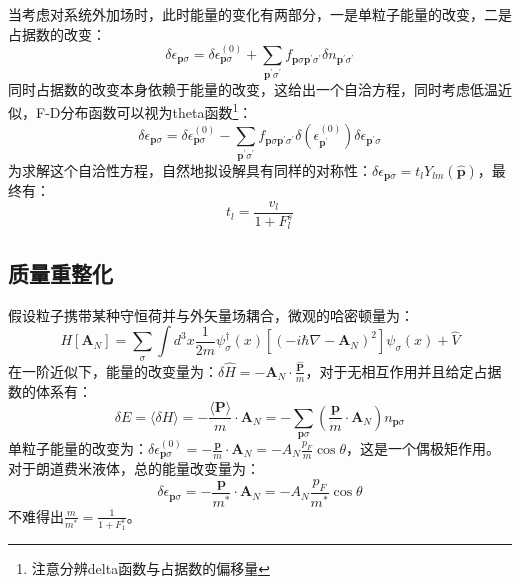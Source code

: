 \documentclass[10pt,openany]{book}
\theoremstyle{thmstyle} %
\theoremstyle{defstyle} %
\theoremstyle{prostyle} %
\begin{document}
当考虑对系统外加场时，此时能量的变化有两部分，一是单粒子能量的改变，二是占据数的改变：
\begin{equation}
	\delta \epsilon_{\mathbf{p} \sigma}=\delta \epsilon_{\mathbf{p} \sigma}^{(0)}+\sum_{\mathbf{p}^{\prime} \sigma^{\prime}} f_{\mathbf{p} \sigma \mathbf{p}^{\prime} \sigma^{\prime}} \delta n_{\mathbf{p}^{\prime} \sigma^{\prime}}
\end{equation}
同时占据数的改变本身依赖于能量的改变，这给出一个自洽方程，同时考虑低温近似，F-D分布函数可以视为theta函数\footnote{注意分辨delta函数与占据数的偏移量}：
\begin{equation}
	\delta \epsilon_{\mathbf{p} \sigma}=\delta \epsilon_{\mathbf{p} \sigma}^{(0)}-\sum_{\mathbf{p}^{\prime} \sigma^{\prime}} f_{\mathbf{p} \sigma \mathbf{p}^{\prime} \sigma^{\prime}} \delta\left(\epsilon_{\mathbf{p}^{\prime}}^{(0)}\right) \delta \epsilon_{\mathbf{p}^{\prime} \sigma}
\end{equation}
为求解这个自洽性方程，自然地拟设解具有同样的对称性：$ \delta \epsilon_{\mathbf{p} \sigma}=t_l Y_{l m}(\hat{\mathbf{p}}) $，最终有：
\begin{equation}
	t_l=\frac{v_l}{1+F_l^s}
\end{equation} 
\subsection{质量重整化}
假设粒子携带某种守恒荷并与外矢量场耦合，微观的哈密顿量为：
\begin{equation}
	H\left[\mathbf{A}_N\right]=\sum_\sigma \int d^3 x \frac{1}{2 m} \psi_\sigma^{\dagger}(x)\left[\left(-i \hbar \nabla-\mathbf{A}_N\right)^2\right] \psi_\sigma(x)+\hat{V}
\end{equation}
在一阶近似下，能量的改变量为：$ \delta \hat{H}=-\mathbf{A}_N \cdot \frac{\hat{\mathbf{P}}}{m} $，对于无相互作用并且给定占据数的体系有：
\begin{equation}
	\delta E=\langle\delta H\rangle=-\frac{\langle\mathbf{P}\rangle}{m} \cdot \mathbf{A}_N=-\sum_{\mathbf{p} \sigma}\left(\frac{\mathbf{p}}{m} \cdot \mathbf{A}_N\right) n_{\mathbf{p} \sigma}
\end{equation} 
单粒子能量的改变为：$ \delta \epsilon_{\mathbf{p} \sigma}^{(0)}=-\frac{\mathbf{p}}{m} \cdot \mathbf{A}_N=-A_N \frac{p_F}{m} \cos \theta $，这是一个偶极矩作用。对于朗道费米液体，总的能量改变量为：
\begin{equation}
	\delta \epsilon_{\mathbf{p} \sigma}=-\frac{\mathbf{p}}{m^*} \cdot \mathbf{A}_N=-A_N \frac{p_F}{m^*} \cos \theta
\end{equation} 
不难得出$ \frac{m}{m^*}=\frac{1}{1+F_1^s} $。 
\end{document}
